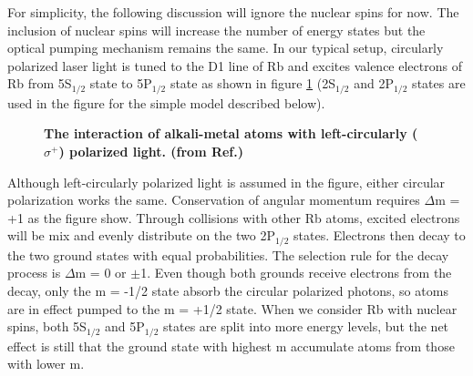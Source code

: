 For simplicity, the following discussion will ignore the nuclear spins for now. The inclusion of nuclear spins will increase the number of energy states but the optical pumping mechanism remains the same. In our typical setup, circularly polarized laser light is tuned to the D1 line of Rb and excites valence electrons of Rb from 5S$_{1/2}$ state to 5P$_{1/2}$ state as shown in figure \ref{fig:OpticalPumping} (2S$_{1/2}$ and 2P$_{1/2}$ states are used in the figure for the simple model described below). 

\begin{figure}[H]
	\centering
	\caption{{\bf The interaction of alkali-metal atoms with left-circularly ($\sigma^{+}$) polarized light. (from Ref.\@ \cite{WalkerHapper})}}
	\label{fig:OpticalPumping}
\end{figure}

Although left-circularly polarized light is assumed in the figure, either circular polarization works the same. Conservation of angular momentum requires $\Delta$m = +1 as the figure show. Through collisions with other Rb atoms, excited electrons will be mix and evenly distribute on the two 2P$_{1/2}$ states. Electrons then decay to the two ground states with equal probabilities. The selection rule for the decay process is $\Delta$m = 0 or $\pm$1. Even though both grounds receive electrons from the decay, only the m = -1/2 state absorb the circular polarized photons, so atoms are in effect pumped to the m = +1/2 state. When we consider Rb with nuclear spins, both 5S$_{1/2}$ and 5P$_{1/2}$ states are split into more energy levels, but the net effect is still that the ground state with highest m accumulate atoms from those with lower m.

